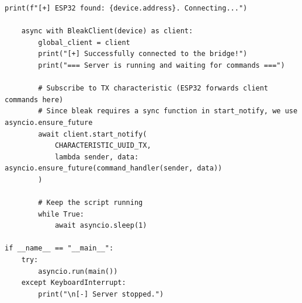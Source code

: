 \begin{lstlisting}[caption={Серверная часть на ПК 2}, label={lst:lab4_server}]
    print(f"[+] ESP32 found: {device.address}. Connecting...")

    async with BleakClient(device) as client:
        global_client = client
        print("[+] Successfully connected to the bridge!")
        print("=== Server is running and waiting for commands ===")

        # Subscribe to TX characteristic (ESP32 forwards client commands here)
        # Since bleak requires a sync function in start_notify, we use asyncio.ensure_future
        await client.start_notify(
            CHARACTERISTIC_UUID_TX,
            lambda sender, data: asyncio.ensure_future(command_handler(sender, data))
        )

        # Keep the script running
        while True:
            await asyncio.sleep(1)

if __name__ == "__main__":
    try:
        asyncio.run(main())
    except KeyboardInterrupt:
        print("\n[-] Server stopped.")
\end{lstlisting}

